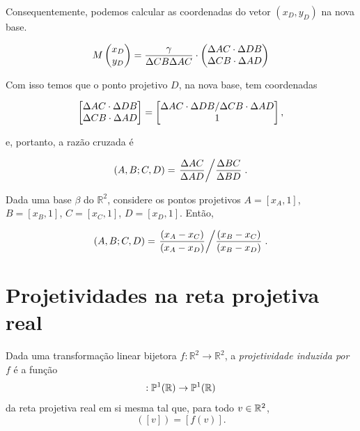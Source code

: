 \begin{sol}
Consequentemente, podemos calcular as coordenadas do vetor \((x_D, y_D)\) na nova base.

\begin{equation}
	 M \begin{pmatrix} x_D \\ y_D \\  \end{pmatrix} =  \frac{\gamma}{\Delta CB \Delta AC} \cdot \begin{pmatrix} \Delta AC \cdot \Delta DB \\ \Delta CB \cdot \Delta AD \\  \end{pmatrix}
\end{equation}


Com isso temos que o ponto projetivo $D$, na nova base, tem coordenadas

\begin{equation}
	 \begin{bmatrix} \Delta AC \cdot \Delta DB \\ \Delta CB \cdot \Delta AD \\  \end{bmatrix} = \begin{bmatrix} \Delta AC \cdot \Delta DB / \Delta CB \cdot \Delta AD \\ 1 \\  \end{bmatrix},
\end{equation}

e, portanto, a razão cruzada é

\begin{equation}
	 (A, B; C, D) = \left. \frac{\Delta AC}{\Delta AD} \middle/ \frac{\Delta BC}{\Delta BD}\right..
\end{equation}

\end{sol}

\begin{cor}
Dada uma base \(\beta\) do \(\mathbb{R}^2\), considere os pontos projetivos $A = [x_A,1]$, $B = [x_B,1]$, $C = [x_C,1]$, $D = [x_D,1]$.
Então,

\begin{equation}
	 (A, B; C, D) = \left. \frac{(x_A - x_C)}{(x_A - x_D)} \middle/ \frac{(x_B - x_C)}{(x_B - x_D)}\right..
\end{equation}

\end{cor}

\section{Projetividades na reta projetiva real}

\begin{defn}
Dada uma transformação linear bijetora \(f\colon \mathbb{R}^2 \to \mathbb{R}^2\), a \emph{projetividade induzida por \(f\)} é a função 
\begin{equation}
  [f]:\PP^1(\RR)\to \PP^1(\RR)
\end{equation}
da reta projetiva real em si mesma tal que, para todo \(v\in \mathbb{R}^2\), 
\begin{equation}
  [f]([v]) = [f(v)].
\end{equation}
\end{defn}

